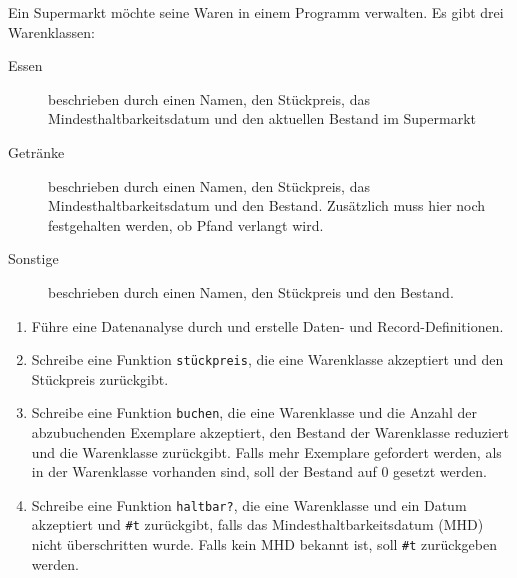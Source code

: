 \begin{aufgabe}
  Ein Supermarkt möchte seine Waren in einem Programm verwalten. Es gibt
  drei Warenklassen:
  \begin{description}
  \item[Essen] beschrieben durch einen Namen, den Stückpreis, das Mindesthaltbarkeitsdatum
    und den aktuellen Bestand im Supermarkt
  \item[Getränke] beschrieben durch einen Namen, den Stückpreis, das Mindesthaltbarkeitsdatum
    und den Bestand. Zusätzlich muss hier noch festgehalten werden, ob Pfand verlangt wird.
  \item[Sonstige] beschrieben durch einen Namen, den Stückpreis und den Bestand.
  \end{description}

  
  \begin{enumerate}
  \item Führe eine Datenanalyse durch und erstelle Daten- und 
    Record-Definitionen.
  \item Schreibe eine Funktion \lstinline{stückpreis}, die eine Warenklasse
    akzeptiert und den Stückpreis zurückgibt.
  \item Schreibe eine Funktion \lstinline{buchen}, die eine Warenklasse und die Anzahl der
    abzubuchenden Exemplare akzeptiert, den Bestand der Warenklasse reduziert und die
    Warenklasse zurückgibt. Falls mehr Exemplare gefordert werden, als in der Warenklasse
    vorhanden sind, soll der Bestand auf 0 gesetzt werden.
  \item Schreibe eine Funktion \lstinline{haltbar?}, die eine
    Warenklasse und ein Datum akzeptiert und \lstinline{#t} zurückgibt, falls das
    Mindesthaltbarkeitsdatum (MHD) nicht überschritten wurde. Falls kein MHD bekannt ist,
    soll \lstinline{#t} zurückgeben werden.
  \end{enumerate}
\end{aufgabe}

